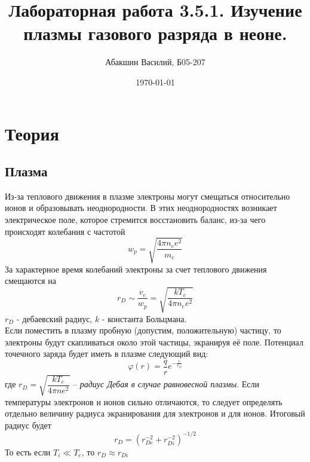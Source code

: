 \documentclass[a4paper, 12pt]{article}
\title{Лабораторная работа 3.5.1. Изучение плазмы газового разряда в неоне.}
\author{Абакшин Василий, Б05-207}
\date{\today}
\begin{document}
	\maketitle
	\section*{Теория}
	\subsection*{Плазма}
	
	Из-за теплового движения в плазме электроны могут смещаться относительно ионов и образовывать неоднородности. В этих неоднородностях возникает электрическое поле, которое стремится восстановить баланс, из-за чего происходят колебания с частотой 
	\[w_p = \sqrt{\frac{4\pi n_e e^2}{m_e}}\]
	За характерное время колебаний электроны за счет теплового движения смещаются на 
	\[r_D \sim \frac{v_e}{w_p} = \sqrt{\frac{kT_e}{4\pi n_e e^2}}\]
	$r_D$ - дебаевский радиус, $k$ - константа Больцмана.\\
	Если поместить в плазму пробную (допустим, положительную) частицу, то электроны будут скапливаться около этой частицы, экранируя её поле. Потенциал точечного заряда будет иметь в плазме следующий вид:
	\[\varphi(r) = \frac{q}{r}e^{-\frac{r}{r_D}}\]
	где $r_D = \sqrt{\dfrac{kT_e}{4\pi n e^2}}$ -- \textit{радиус Дебая в случае равновесной плазмы}. Если температуры электронов и ионов сильно отличаются, то следует определять отдельно величину радиуса экранирования для электронов и для ионов. Итоговый радиус будет
	\[r_D = (r_{De}^{-2} + r_{Di}^{-2})^{-1/2}\]
	То есть если $T_i \ll T_e$, то $r_D \approx r_{Di}$ 
\end{document}
